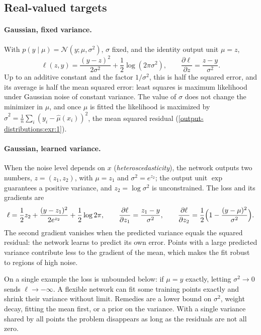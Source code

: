 \begin{notechapter}
\section{Real-valued targets}\label{output-distributions:sec:real}

\paragraph{Gaussian, fixed variance.} With $p(y\mid\mu) = \mathcal N(y;\mu,\sigma^2)$, $\sigma$ fixed, and
the identity output unit $\mu = z$,
\[
  \ell(z, y) = \frac{(y - z)^2}{2\sigma^2} + \frac12\log(2\pi\sigma^2),\qquad
  \frac{\partial\ell}{\partial z} = \frac{z - y}{\sigma^2}.
\]
Up to an additive constant and the factor $1/\sigma^2$, this is half the squared error, and
its average is half the mean squared error: least squares is maximum likelihood
under Gaussian noise of constant variance. The value of $\sigma$ does not change the
minimizer in $\mu$, and once $\mu$ is fitted the likelihood is maximized by
$\hat\sigma^2 = \frac1n\sum_i(y_i - \hat\mu(x_i))^2$, the mean squared residual
(\cref{output-distributions:exr:1}).

\paragraph{Gaussian, learned variance.} When the noise level depends on $x$
(\emph{heteroscedasticity}), the network outputs two numbers, $z = (z_1, z_2)$, with
$\mu = z_1$ and $\sigma^2 = e^{z_2}$; the output unit $\exp$ guarantees a positive variance,
and $z_2 = \log\sigma^2$ is unconstrained. The loss and its gradients are
\[
  \ell = \frac12z_2 + \frac{(y - z_1)^2}{2e^{z_2}} + \frac12\log2\pi,\qquad
  \frac{\partial\ell}{\partial z_1} = \frac{z_1 - y}{\sigma^2},\qquad
  \frac{\partial\ell}{\partial z_2} = \frac12\Bigl(1 - \frac{(y - \mu)^2}{\sigma^2}\Bigr).
\]
The second gradient vanishes when the predicted variance equals the squared
residual: the network learns to predict its own error. Points with a large
predicted variance contribute less to the gradient of the mean, which makes the
fit robust to regions of high noise.

\begin{pitfall}
On a single example the loss is unbounded below: if $\mu = y$ exactly, letting
$\sigma^2\to0$ sends $\ell\to-\infty$. A flexible network can fit some training points
exactly and shrink their variance without limit. Remedies are a lower bound on
$\sigma^2$, weight decay, fitting the mean first, or a prior on the variance. With a
single variance shared by all points the problem disappears as long as the
residuals are not all zero.
\end{pitfall}


\end{notechapter}
